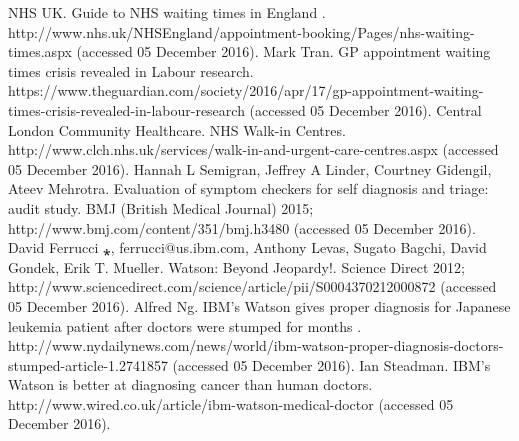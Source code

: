 \documentclass{article}
\begin{document}
\begin{thebibliography}{6}
        NHS UK. Guide to NHS waiting times in England .
        http://www.nhs.uk/NHSEngland/appointment-booking/Pages/nhs-waiting-times.aspx
        (accessed 05 December 2016).
        Mark Tran. GP appointment waiting times crisis revealed in Labour
        research.
        https://www.theguardian.com/society/2016/apr/17/gp-appointment-waiting-times-crisis-revealed-in-labour-research
        (accessed 05 December 2016).
        Central London Community Healthcare. NHS Walk-in Centres.
        http://www.clch.nhs.uk/services/walk-in-and-urgent-care-centres.aspx
        (accessed 05 December 2016).
        Hannah L Semigran, Jeffrey A Linder, Courtney Gidengil, Ateev Mehrotra.
        Evaluation of symptom checkers for self diagnosis and triage: audit
        study. BMJ (British Medical Journal) 2015;
        http://www.bmj.com/content/351/bmj.h3480 (accessed 05 December 2016).
        David Ferrucci ⁎, ferrucci@us.ibm.com, Anthony Levas, Sugato Bagchi,
        David Gondek, Erik T. Mueller. Watson: Beyond Jeopardy!. Science Direct
        2012;
        http://www.sciencedirect.com/science/article/pii/S0004370212000872
        (accessed 05 December 2016).
        Alfred Ng. IBM’s Watson gives proper diagnosis for Japanese leukemia
        patient after doctors were stumped for months .
        http://www.nydailynews.com/news/world/ibm-watson-proper-diagnosis-doctors-stumped-article-1.2741857
        (accessed 05 December 2016).
        Ian Steadman. IBM's Watson is better at diagnosing cancer than human
        doctors. http://www.wired.co.uk/article/ibm-watson-medical-doctor
        (accessed 05 December 2016).
\end{thebibliography}
\end{document}
